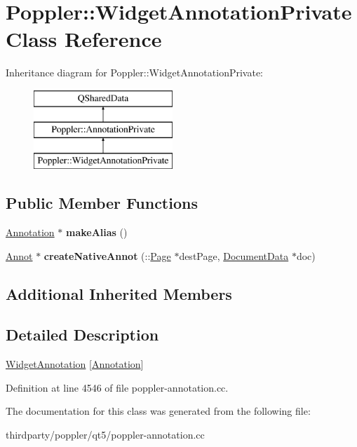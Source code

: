 \hypertarget{class_poppler_1_1_widget_annotation_private}{}\section{Poppler\+:\+:Widget\+Annotation\+Private Class Reference}
\label{class_poppler_1_1_widget_annotation_private}
Inheritance diagram for Poppler\+:\+:Widget\+Annotation\+Private\+:\begin{figure}[H]
\begin{center}
\leavevmode
\includegraphics[height=3.000000cm]{class_poppler_1_1_widget_annotation_private}
\end{center}
\end{figure}
\subsection*{Public Member Functions}
\begin{DoxyCompactItemize}
\item 
\mbox{\label{class_poppler_1_1_widget_annotation_private_a479e93308401a197c1f321438b6fe448}} 
\hyperlink{class_poppler_1_1_annotation}{Annotation} $\ast$ {\bfseries make\+Alias} ()
\item 
\mbox{\label{class_poppler_1_1_widget_annotation_private_aca137ce19ba1de3cffe5c5a6cb3336c7}} 
\hyperlink{class_annot}{Annot} $\ast$ {\bfseries create\+Native\+Annot} (\+::\hyperlink{class_poppler_1_1_page}{Page} $\ast$dest\+Page, \hyperlink{class_poppler_1_1_document_data}{Document\+Data} $\ast$doc)
\end{DoxyCompactItemize}
\subsection*{Additional Inherited Members}


\subsection{Detailed Description}
\hyperlink{class_poppler_1_1_widget_annotation}{Widget\+Annotation} \mbox{[}\hyperlink{class_poppler_1_1_annotation}{Annotation}\mbox{]} 

Definition at line 4546 of file poppler-\/annotation.\+cc.



The documentation for this class was generated from the following file\+:\begin{DoxyCompactItemize}
\item 
thirdparty/poppler/qt5/poppler-\/annotation.\+cc\end{DoxyCompactItemize}
